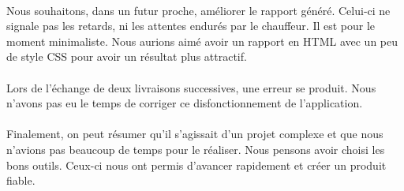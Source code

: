 \documentclass[10pt,a4paper]{book}
\begin{document}
\paragraph{}
Nous souhaitons, dans un futur proche, améliorer le rapport généré. Celui-ci ne signale pas les retards, ni les attentes endurés par le chauffeur. Il est pour le moment minimaliste. Nous aurions aimé avoir un rapport en HTML avec un peu de style CSS pour avoir un résultat plus attractif.
\paragraph{}
Lors de l'échange de deux livraisons successives, une erreur se produit. Nous n'avons pas eu le temps de corriger ce disfonctionnement de l'application.

\paragraph{}
Finalement, on peut résumer qu'il s'agissait d'un projet complexe et que nous n'avions pas beaucoup de temps pour le réaliser. Nous pensons avoir choisi les bons outils. Ceux-ci nous ont permis d'avancer rapidement et créer un produit fiable.
\appendix{}
\end{document}
